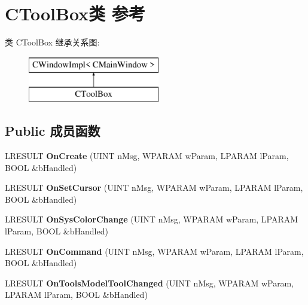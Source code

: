 \hypertarget{class_c_tool_box}{}\section{C\+Tool\+Box类 参考}
\label{class_c_tool_box}
类 C\+Tool\+Box 继承关系图\+:\begin{figure}[H]
\begin{center}
\leavevmode
\includegraphics[height=2.000000cm]{class_c_tool_box}
\end{center}
\end{figure}
\subsection*{Public 成员函数}
\begin{DoxyCompactItemize}
\item 
\mbox{\label{class_c_tool_box_a393748613307bcba56872fde6b3ececa}} 
L\+R\+E\+S\+U\+LT {\bfseries On\+Create} (U\+I\+NT n\+Msg, W\+P\+A\+R\+AM w\+Param, L\+P\+A\+R\+AM l\+Param, B\+O\+OL \&b\+Handled)
\item 
\mbox{\label{class_c_tool_box_ad9c2aa8998d92d5feb6169ba674aea15}} 
L\+R\+E\+S\+U\+LT {\bfseries On\+Set\+Cursor} (U\+I\+NT n\+Msg, W\+P\+A\+R\+AM w\+Param, L\+P\+A\+R\+AM l\+Param, B\+O\+OL \&b\+Handled)
\item 
\mbox{\label{class_c_tool_box_a10e234cb59bcc45c6393b70cb0854a34}} 
L\+R\+E\+S\+U\+LT {\bfseries On\+Sys\+Color\+Change} (U\+I\+NT n\+Msg, W\+P\+A\+R\+AM w\+Param, L\+P\+A\+R\+AM l\+Param, B\+O\+OL \&b\+Handled)
\item 
\mbox{\label{class_c_tool_box_aba7f4edb97ec8dbd49e89062537e3fa8}} 
L\+R\+E\+S\+U\+LT {\bfseries On\+Command} (U\+I\+NT n\+Msg, W\+P\+A\+R\+AM w\+Param, L\+P\+A\+R\+AM l\+Param, B\+O\+OL \&b\+Handled)
\item 
\mbox{\label{class_c_tool_box_aaf95e1855ffda208cac5b8db696abe9a}} 
L\+R\+E\+S\+U\+LT {\bfseries On\+Tools\+Model\+Tool\+Changed} (U\+I\+NT n\+Msg, W\+P\+A\+R\+AM w\+Param, L\+P\+A\+R\+AM l\+Param, B\+O\+OL \&b\+Handled)
\end{DoxyCompactItemize}
